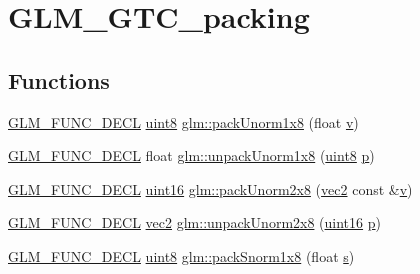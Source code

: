 \hypertarget{group__gtc__packing}{}\section{G\+L\+M\+\_\+\+G\+T\+C\+\_\+packing}
\label{group__gtc__packing}
\subsection*{Functions}
\begin{DoxyCompactItemize}
\item 
\mbox{\hyperlink{setup_8hpp_ab2d052de21a70539923e9bcbf6e83a51}{G\+L\+M\+\_\+\+F\+U\+N\+C\+\_\+\+D\+E\+CL}} \mbox{\hyperlink{group__gtc__type__precision_ga1a7dcd8aac97cc8020817c94049deff2}{uint8}} \mbox{\hyperlink{group__gtc__packing_ga2f9963e5d762b10085b280d3662017ba}{glm\+::pack\+Unorm1x8}} (float \mbox{\hyperlink{_s_d_l__opengl_8h_a10a82eabcb59d2fcd74acee063775f90}{v}})
\item 
\mbox{\hyperlink{setup_8hpp_ab2d052de21a70539923e9bcbf6e83a51}{G\+L\+M\+\_\+\+F\+U\+N\+C\+\_\+\+D\+E\+CL}} float \mbox{\hyperlink{group__gtc__packing_ga32f3f2642df2ea87449d59fb614a8305}{glm\+::unpack\+Unorm1x8}} (\mbox{\hyperlink{group__gtc__type__precision_ga1a7dcd8aac97cc8020817c94049deff2}{uint8}} \mbox{\hyperlink{_s_d_l__opengl__glext_8h_aa5367c14d90f462230c2611b81b41d23}{p}})
\item 
\mbox{\hyperlink{setup_8hpp_ab2d052de21a70539923e9bcbf6e83a51}{G\+L\+M\+\_\+\+F\+U\+N\+C\+\_\+\+D\+E\+CL}} \mbox{\hyperlink{group__gtc__type__precision_gad8c2939e1fdd8e5828b31d95c52255d5}{uint16}} \mbox{\hyperlink{group__gtc__packing_ga833288fc0d4a79f19d0db75a6843bfe6}{glm\+::pack\+Unorm2x8}} (\mbox{\hyperlink{group__core__types_gaa1618f51db67eaa145db101d8c8431d8}{vec2}} const \&\mbox{\hyperlink{_s_d_l__opengl_8h_a10a82eabcb59d2fcd74acee063775f90}{v}})
\item 
\mbox{\hyperlink{setup_8hpp_ab2d052de21a70539923e9bcbf6e83a51}{G\+L\+M\+\_\+\+F\+U\+N\+C\+\_\+\+D\+E\+CL}} \mbox{\hyperlink{group__core__types_gaa1618f51db67eaa145db101d8c8431d8}{vec2}} \mbox{\hyperlink{group__gtc__packing_ga96ce0c24339ee676e28a027fffd1edf6}{glm\+::unpack\+Unorm2x8}} (\mbox{\hyperlink{group__gtc__type__precision_gad8c2939e1fdd8e5828b31d95c52255d5}{uint16}} \mbox{\hyperlink{_s_d_l__opengl__glext_8h_aa5367c14d90f462230c2611b81b41d23}{p}})
\item 
\mbox{\hyperlink{setup_8hpp_ab2d052de21a70539923e9bcbf6e83a51}{G\+L\+M\+\_\+\+F\+U\+N\+C\+\_\+\+D\+E\+CL}} \mbox{\hyperlink{group__gtc__type__precision_ga1a7dcd8aac97cc8020817c94049deff2}{uint8}} \mbox{\hyperlink{group__gtc__packing_ga26b6cd7a35c46c4b6a342f3b97b47423}{glm\+::pack\+Snorm1x8}} (float \mbox{\hyperlink{_s_d_l__opengl_8h_a4af680a6c683f88ed67b76f207f2e6e4}{s}})

\end{DoxyCompactItemize}
